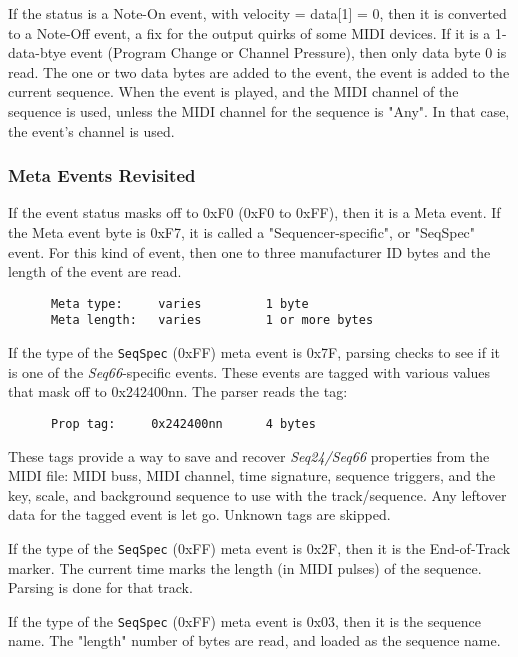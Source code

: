    If the status is a Note-On event, with velocity = data[1] = 0,
   then it is converted to a Note-Off event, a fix for the output quirks of
   some MIDI devices.
   If it is a 1-data-btye event (Program Change or Channel Pressure), then only
   data byte 0 is read.
   The one or two data bytes are added to the event,
   the event is added to the current sequence.
   When the event is played,
   and the MIDI channel of the sequence is used, unless
   the MIDI channel for the sequence is "Any".
   In that case, the event's channel is used.

\subsubsection{Meta Events Revisited}
\label{subsubsec:midi_format_meta_events_revisited}

   If the event status masks off to 0xF0 (0xF0 to 0xFF), then it is a Meta
   event.  If the Meta event byte is 0xF7, it is called a "Sequencer-specific",
   or "SeqSpec" event.  For this kind of event, then one to three manufacturer
   ID bytes and the length of the event are read.

   \begin{verbatim}
      Meta type:     varies         1 byte
      Meta length:   varies         1 or more bytes
   \end{verbatim}

   If the type of the
   \texttt{SeqSpec} (0xFF) meta event is 0x7F, parsing checks to see
   if it is one of the \textsl{Seq66}-specific events.  These events are tagged
   with various values that mask off to 0x242400nn.  The parser reads the
   tag:

   \begin{verbatim}
      Prop tag:     0x242400nn      4 bytes
   \end{verbatim}

   These tags provide a way to save and recover \textsl{Seq24/Seq66} properties
   from the MIDI file: MIDI buss, MIDI channel, time signature, sequence
   triggers, and the key, scale, and background sequence to use with the
   track/sequence.  Any leftover data for the tagged event is let go.
   Unknown tags are skipped.

   If the type of the
   \texttt{SeqSpec} (0xFF) meta event is 0x2F, then it is the
   End-of-Track marker.  The current time marks the length (in MIDI pulses) of
   the sequence.  Parsing is done for that track.

   If the type of the
   \texttt{SeqSpec} (0xFF) meta event is 0x03, then it is the
   sequence name.  The "length" number of bytes are read, and loaded as the
   sequence name.

